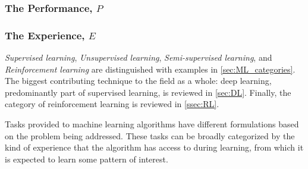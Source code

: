 

\subsubsection{The Performance, $P$\label{sec:ML_performance}}

\subsubsection{The Experience, $E$\label{sec:ML_experience}}
\textit{Supervised learning},
\textit{Unsupervised learning}, \textit{Semi-supervised learning}, and
\textit{Reinforcement learning} are distinguished with examples in
\autoref{sec:ML_categories}. The biggest contributing technique to the field as
a whole: deep learning, predominantly part of supervised learning, is reviewed
in \autoref{sec:DL}. Finally, the category of reinforcement learning is reviewed
in \autoref{ssec:RL}.

Tasks provided to machine learning algorithms have different formulations based
on the problem being addressed. These tasks can be broadly categorized by
the kind of experience that the algorithm has access to during learning, from
which it is expected to learn some pattern of interest.

